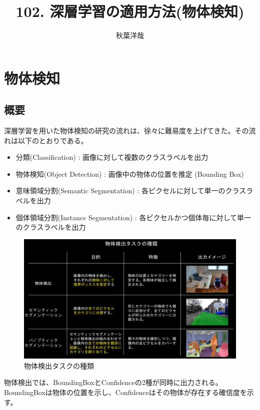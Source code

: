 \documentclass{ltjsarticle}
\begin{document}
\title{102. 深層学習の適用方法(物体検知)}
\author{秋葉洋哉}
\maketitle

\section{物体検知}
\subsection{概要}
深層学習を用いた物体検知の研究の流れは、徐々に難易度を上げてきた。その流れは以下のとおりである。
\begin{itemize}
  \item 分類(Classification) : 画像に対して複数のクラスラベルを出力
  \item 物体検知(Object Detection) : 画像中の物体の位置を推定 (Bounding Box)
  \item 意味領域分割(Semantic Segmentation) : 各ピクセルに対して単一のクラスラベルを出力
  \item 個体領域分割(Instance Segmentation) : 各ピクセルかつ個体毎に対して単一のクラスラベルを出力
\end{itemize}

\begin{figure}[htbp]
  \centering
  \includegraphics[width=13cm]{./capture/Matrix.png}
  \caption{物体検出タスクの種類}
  \label{fig:Matrix}
\end{figure}

物体検出では、BoundingBoxとConfidenceの2種が同時に出力される。BoundingBoxは物体の位置を示し、Confidenceはその物体が存在する確信度を示す。
\end{document}
